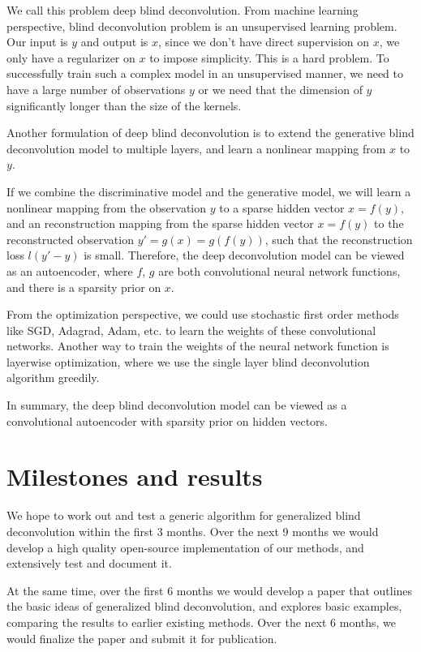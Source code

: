 \documentclass[12pt]{article}
\begin{document}
We call this problem deep blind deconvolution. From machine learning perspective, blind deconvolution problem is an unsupervised learning problem.  Our input is $y$ and output is $x$, since we don’t have direct supervision on $x$, we only have a regularizer on $x$ to impose simplicity.  This is a hard problem. To successfully train such a complex model in an unsupervised manner, we need to have a large number of observations $y$ or we need that the dimension of $y$ significantly longer than the size of the kernels.

Another formulation of deep blind deconvolution is to extend the generative blind deconvolution model to multiple layers, and learn a nonlinear mapping from $x$ to $y$.

If we combine the discriminative model and the generative model, we will learn a nonlinear mapping from the observation $y$ to a sparse hidden vector $x= f(y)$, and an reconstruction mapping from the sparse hidden vector $x= f(y)$ to the reconstructed observation $y' = g(x)= g(f(y))$, such that the reconstruction loss $l(y'-y)$ is small. Therefore, the deep deconvolution model can be viewed as an autoencoder, where $f$, $g$ are both convolutional neural network functions, and there is a sparsity prior on $x$.  

From the optimization perspective, we could use stochastic first order methods like SGD, Adagrad, Adam, etc. to learn the weights of these convolutional networks.  Another way to train the weights of the neural network function is layerwise optimization, where we use the single layer blind deconvolution algorithm greedily.  

In summary, the deep blind deconvolution model can be viewed as a convolutional autoencoder with sparsity prior on hidden vectors. 


\section{Milestones and results}
We hope to work out and test a generic algorithm for generalized blind deconvolution within the 
first 3 months.  
Over the next 9 months we would develop a high quality open-source implementation of 
our methods, and extensively test and document it.

At the same time, over the first 6 months we would develop a paper that 
outlines the basic ideas of generalized
blind deconvolution, and explores basic examples, comparing the results to earlier existing
methods.  Over the next 6 months, we would finalize the paper and submit it for publication.
\end{document}
